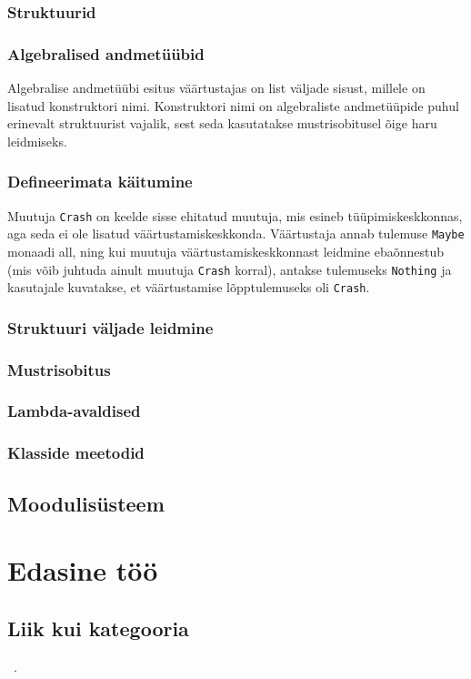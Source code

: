 \documentclass[12pt]{article}
\newcommand\peatykk[1]{
  \clearpage
  \section{#1}}
\begin{document}
      \subsubsection{Struktuurid}
        
      \subsubsection{Algebralised andmetüübid}
        Algebralise andmetüübi esitus väärtustajas on list väljade sisust, millele on lisatud konstruktori nimi. Konstruktori nimi on algebraliste andmetüüpide puhul erinevalt struktuurist vajalik, sest seda kasutatakse mustrisobitusel õige haru leidmiseks.
      \subsubsection{Defineerimata käitumine}
        Muutuja \verb!Crash! on keelde sisse ehitatud muutuja, mis esineb tüüpimiskeskkonnas, aga seda ei ole lisatud väärtustamiskeskkonda. Väärtustaja annab tulemuse \verb!Maybe! monaadi all, ning kui muutuja väärtustamiskeskkonnast leidmine ebaõnnestub (mis võib juhtuda ainult muutuja \verb!Crash! korral), antakse tulemuseks \verb!Nothing! ja kasutajale kuvatakse, et väärtustamise lõpptulemuseks oli \verb!Crash!.
      \subsubsection{Struktuuri väljade leidmine}
        
      \subsubsection{Mustrisobitus}
        
      \subsubsection{Lambda-avaldised}
        
      \subsubsection{Klasside meetodid}
        
    \subsection{Moodulisüsteem}
      
  \peatykk{Edasine töö}
    \subsection{Liik kui kategooria}
      ~\cite{Cat}.
\end{document}
